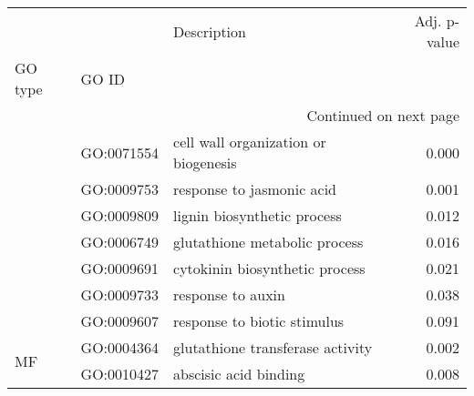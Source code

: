 \begin{longtable}{lllr}
\toprule
   &            &                           Description &  Adj. p-value \\
GO type & GO ID &                                       &               \\
\midrule
\endhead
\midrule
\multicolumn{4}{r}{{Continued on next page}} \\
\midrule
\endfoot

\bottomrule
\endlastfoot
\multirow{7}{*}{BP} & GO:0071554 &  cell wall organization or biogenesis &         0.000 \\
   & GO:0009753 &             response to jasmonic acid &         0.001 \\
   & GO:0009809 &           lignin biosynthetic process &         0.012 \\
   & GO:0006749 &         glutathione metabolic process &         0.016 \\
   & GO:0009691 &        cytokinin biosynthetic process &         0.021 \\
   & GO:0009733 &                     response to auxin &         0.038 \\
   & GO:0009607 &           response to biotic stimulus &         0.091 \\
\cline{1-4}
\multirow{2}{*}{MF} & GO:0004364 &      glutathione transferase activity &         0.002 \\
   & GO:0010427 &                 abscisic acid binding &         0.008 \\
\end{longtable}
